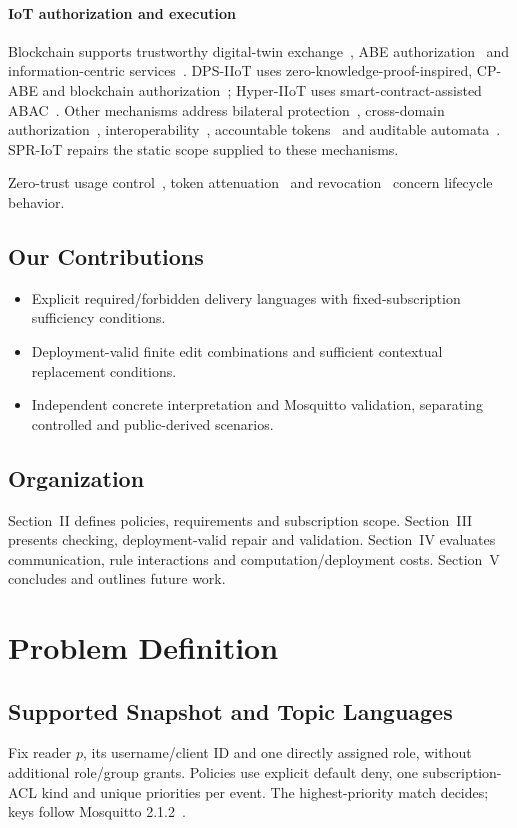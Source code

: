 \documentclass[letterpaper,journal]{IEEEtran}
\begin{document}
\paragraph{IoT authorization and execution}
Blockchain supports trustworthy digital-twin exchange~\cite{li_dt_survey}, ABE authorization~\cite{dt_abe} and information-centric services~\cite{icn_survey}. DPS-IIoT uses zero-knowledge-proof-inspired, CP-ABE and blockchain authorization~\cite{li_dps}; Hyper-IIoT uses smart-contract-assisted ABAC~\cite{li_hyper}. Other mechanisms address bilateral protection~\cite{pdcs}, cross-domain authorization~\cite{scpa}, interoperability~\cite{crossplatform}, accountable tokens~\cite{tbac} and auditable automata~\cite{event_audit}. SPR-IoT repairs the static scope supplied to these mechanisms.

Zero-trust usage control~\cite{ztaiot}, token attenuation~\cite{stateful_auth} and revocation~\cite{evoke} concern lifecycle behavior.

\subsection{Our Contributions}
\begin{itemize}
\item Explicit required/forbidden delivery languages with fixed-subscription sufficiency conditions.
\item Deployment-valid finite edit combinations and sufficient contextual replacement conditions.
\item Independent concrete interpretation and Mosquitto validation, separating controlled and public-derived scenarios.
\end{itemize}

\subsection{Organization}
Section~II defines policies, requirements and subscription scope. Section~III presents checking, deployment-valid repair and validation. Section~IV evaluates communication, rule interactions and computation/deployment costs. Section~V concludes and outlines future work.


\section{Problem Definition}
\subsection{Supported Snapshot and Topic Languages}
Fix reader $p$, its username/client ID and one directly assigned role, without additional role/group grants. Policies use explicit default deny, one subscription-ACL kind and unique priorities per event. The highest-priority match decides; keys follow Mosquitto 2.1.2~\cite{mosquitto_dynsec,mosquitto_roles212}.
\end{document}
